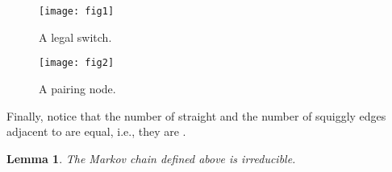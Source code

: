 \documentclass[12pt,a4paper]{article}
\theoremstyle{definition}
\theoremstyle{plain}
\newtheorem{lemma}[dfn]{Lemma}
\begin{document}
\begin{figure}[h]
\hspace{-0.5cm}
\begin{minipage}[b]{0.65\linewidth}
\centering
\texttt{[image: fig1]}
\caption{A legal switch.}
\label{fig1}
\end{minipage}
\hspace{-3cm}
\begin{minipage}[b]{0.65\linewidth}
\centering
\texttt{[image: fig2]}
\caption{A pairing node.}
\label{fig2}
\end{minipage}
\end{figure}

Finally, notice that  the number of straight and the number of
squiggly edges adjacent to  are equal, i.e., they are .


\begin{lemma}
The Markov chain  defined above is irreducible.
\end{lemma}
\end{document}
